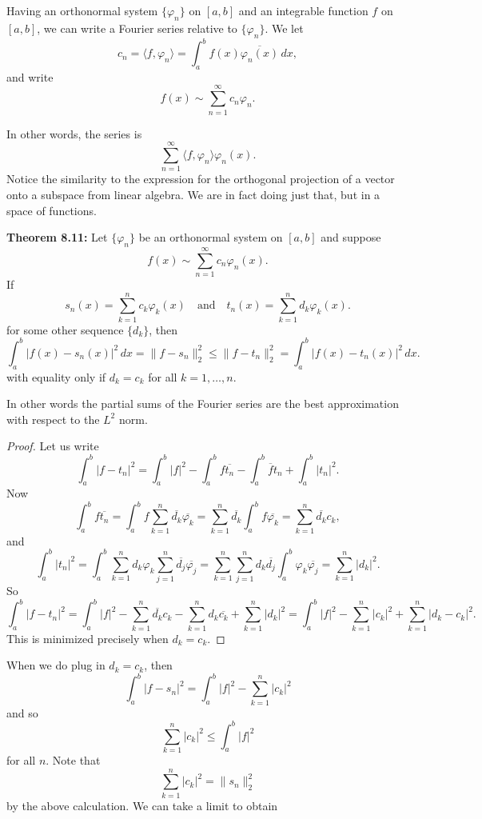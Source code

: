 \documentclass[12pt]{book}
\newcommand{\snorm}[1]{\lVert {#1} \rVert}
\newcommand{\abs}[1]{\left\lvert {#1} \right\rvert}
\theoremstyle{plain}
\theoremstyle{remark}
\theoremstyle{definition}
\theoremstyle{exercise}
\theoremstyle{example}
\begin{document}
\medskip

Having an orthonormal system $\{ \varphi_n \}$ on $[a,b]$ and an integrable function $f$
on $[a,b]$, we can write
a Fourier series relative to $\{ \varphi_n \}$.  We let
$$
c_n =
\langle f , \varphi_n \rangle
=
\int_a^b f(x) \overline{\varphi_n(x)}\,dx ,
$$
and write
$$
f(x) \sim \sum_{n=1}^\infty c_n \varphi_n .
$$

In other words, the series is
$$
\sum_{n=1}^\infty \langle f , \varphi_n \rangle \varphi_n(x) .
$$
Notice the similarity to the expression for the orthogonal
projection of a vector onto a subspace from linear algebra.  We are
in fact doing just that, but in a space of functions.

\medskip

\textbf{Theorem 8.11:}
Let $\{ \varphi_n \}$ be an orthonormal system on $[a,b]$ and
suppose
$$
f(x) \sim \sum_{n=1}^\infty c_n \varphi_n(x) .
$$
If
$$
s_n (x) = \sum_{k=1}^n c_k \varphi_k(x)
\quad\text{and}\quad
t_n (x) = \sum_{k=1}^n d_k \varphi_k(x) .
$$
for some other sequence $\{ d_k \}$, then
$$
\int_a^b \abs{f(x)-s_n(x)}^2 \, dx = \snorm{f-s_n}_2^2 \leq
\snorm{f-t_n}_2^2 = \int_a^b \abs{f(x)-t_n(x)}^2 \, dx .
$$
with equality only if $d_k = c_k$ for all $k=1,\ldots,n$.

\medskip

In other words the partial sums of the Fourier series are the best approximation with respect to the
$L^2$ norm.

\begin{proof}
Let us write
$$
\int_a^b \abs{f-t_n}^2
=
\int_a^b \abs{f}^2
-
\int_a^b f \overline{t_n}
-
\int_a^b \overline{f} t_n
+
\int_a^b \abs{t_n}^2 .
$$
Now
$$
\int_a^b f \overline{t_n}
=
\int_a^b f \sum_{k=1}^n \overline{d_k} \overline{\varphi_k}
=
 \sum_{k=1}^n \overline{d_k} \int_a^b f \overline{\varphi_k}
=
 \sum_{k=1}^n \overline{d_k} c_k ,
$$
and
$$
\int_a^b \abs{t_n}^2
=
\int_a^b
\sum_{k=1}^n d_k \varphi_k
\sum_{j=1}^n \overline{d_j} \overline{\varphi_j}
=
\sum_{k=1}^n
\sum_{j=1}^n 
d_k
\overline{d_j} 
\int_a^b
\varphi_k
\overline{\varphi_j}
=
\sum_{k=1}^n
\abs{d_k}^2 .
$$
So
$$
\int_a^b \abs{f-t_n}^2
=
\int_a^b \abs{f}^2
-
\sum_{k=1}^n \overline{d_k} c_k
-
\sum_{k=1}^n d_k \overline{c_k}
+
\sum_{k=1}^n
\abs{d_k}^2
=
\int_a^b \abs{f}^2
-
\sum_{k=1}^n \abs{c_k}^2
+
\sum_{k=1}^n
\abs{d_k-c_k}^2 .
$$
This is minimized precisely when $d_k = c_k$.
\end{proof}

When we do plug in $d_k = c_k$, then
$$
\int_a^b \abs{f-s_n}^2
=
\int_a^b \abs{f}^2
-
\sum_{k=1}^n \abs{c_k}^2
$$
and so
$$
\sum_{k=1}^n \abs{c_k}^2
\leq
\int_a^b \abs{f}^2
$$
for all $n$.  Note that
$$
\sum_{k=1}^n \abs{c_k}^2 = \snorm{s_n}_2^2
$$
by the above calculation.
We can take a limit to obtain
\end{document}
